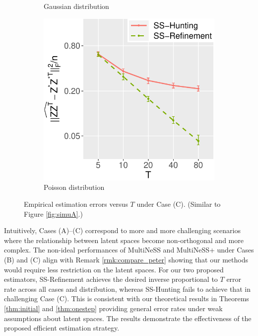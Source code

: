 \documentclass[12pt]{article}
\begin{document}
\begin{figure}
\begin{subfigure}{0.29\textwidth}
    \caption{Gaussian distribution}
\end{subfigure}
\begin{subfigure}{0.29\textwidth}
	\centering
	\includegraphics[width=1\linewidth]{Figures/Simu_PC.pdf}
    \caption{Poisson distribution}
\end{subfigure}
\caption{Empirical estimation errors versus $T$ under Case (C). (Similar to Figure \ref{fig:simuA}.)}
\label{fig:simuC}
\end{figure}

Intuitively, Cases (A)--(C) correspond to more and more challenging scenarios where the relationship between latent spaces become non-orthogonal and more complex. 
The non-ideal performances of MultiNeSS and MultiNeSS+ under Cases (B) and (C)
 align with Remark \ref{rmk:compare_peter} showing that our methods would require  less restriction on the latent spaces. 
For our two proposed estimators, 
SS-Refinement achieves the desired inverse proportional to $T$ error rate across all cases and distribution, whereas  SS-Hunting fails to achieve that in  challenging Case (C). 
This is consistent with our theoretical results in Theorems \ref{thm:initial} and \ref{thm:onestep} providing general error rates under weak assumptions about latent spaces. 
The results demonstrate the effectiveness of the proposed efficient estimation strategy. 
\end{document}
